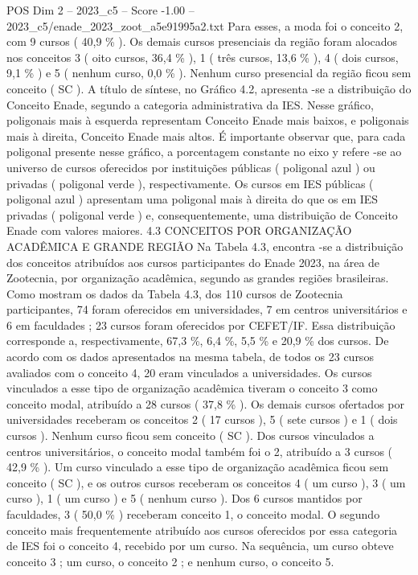 \begin{textsample}{POS Dim 2 – 2023\_c5 – Score -1.00 – 2023\_c5/enade\_2023\_zoot\_a5e91995a2.txt}
Para esses, a moda foi o conceito 2, com 9 cursos ( 40,9 \% ).
Os demais cursos presenciais da região foram alocados nos conceitos 3 ( oito cursos, 36,4 \% ), 1 ( três cursos, 13,6 \% ), 4 ( dois cursos, 9,1 \% ) e 5 ( nenhum curso, 0,0 \% ).
Nenhum curso presencial da região ficou sem conceito ( SC ).
A título de síntese, no Gráfico 4.2, apresenta -se a distribuição do Conceito Enade, segundo a categoria administrativa da IES.
Nesse gráfico, poligonais mais à esquerda representam Conceito Enade mais baixos, e poligonais mais à direita, Conceito Enade mais altos.
É importante observar que, para cada poligonal presente nesse gráfico, a porcentagem constante no eixo y refere -se ao universo de cursos oferecidos por instituições públicas ( poligonal azul ) ou privadas ( poligonal verde ), respectivamente.
Os cursos em IES públicas ( poligonal azul ) apresentam uma poligonal mais à direita do que os em IES privadas ( poligonal verde ) e, consequentemente, uma distribuição de Conceito Enade com valores maiores. 4.3 CONCEITOS POR ORGANIZAÇÃO ACADÊMICA E GRANDE REGIÃO Na Tabela 4.3, encontra -se a distribuição dos conceitos atribuídos aos cursos participantes do Enade 2023, na área de Zootecnia, por organização acadêmica, segundo as grandes regiões brasileiras.
Como mostram os dados da Tabela 4.3, dos 110 cursos de Zootecnia participantes, 74 foram oferecidos em universidades, 7 em centros universitários e 6 em faculdades ; 23 cursos foram oferecidos por CEFET/IF.
Essa distribuição corresponde a, respectivamente, 67,3 \%, 6,4 \%, 5,5 \% e 20,9 \% dos cursos.
De acordo com os dados apresentados na mesma tabela, de todos os 23 cursos avaliados com o conceito 4, 20 eram vinculados a universidades.
Os cursos vinculados a esse tipo de organização acadêmica tiveram o conceito 3 como conceito modal, atribuído a 28 cursos ( 37,8 \% ).
Os demais cursos ofertados por universidades receberam os conceitos 2 ( 17 cursos ), 5 ( sete cursos ) e 1 ( dois cursos ).
Nenhum curso ficou sem conceito ( SC ).
Dos cursos vinculados a centros universitários, o conceito modal também foi o 2, atribuído a 3 cursos ( 42,9 \% ).
Um curso vinculado a esse tipo de organização acadêmica ficou sem conceito ( SC ), e os outros cursos receberam os conceitos 4 ( um curso ), 3 ( um curso ), 1 ( um curso ) e 5 ( nenhum curso ).
Dos 6 cursos mantidos por faculdades, 3 ( 50,0 \% ) receberam conceito 1, o conceito modal.
O segundo conceito mais frequentemente atribuído aos cursos oferecidos por essa categoria de IES foi o conceito 4, recebido por um curso.
Na sequência, um curso obteve conceito 3 ; um curso, o conceito 2 ; e nenhum curso, o conceito 5.

\end{textsample}
